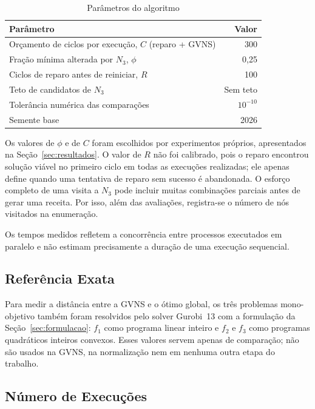 \documentclass[conference]{IEEEtran}
\newcommand{\Cparada}{300}
\begin{document}
\begin{table}[htbp]
\caption{Parâmetros do algoritmo}
\centering
\begin{tabular}{p{} r}
\toprule
\textbf{Parâmetro} & \textbf{Valor} \\
\midrule
Orçamento de ciclos por execução, $C$ (reparo + GVNS) & \Cparada \\
Fração mínima alterada por $N_3$, $\phi$ & 0{,}25 \\
Ciclos de reparo antes de reiniciar, $R$ & 100 \\
Teto de candidatos de $N_3$ & Sem teto \\
Tolerância numérica das comparações & $10^{-10}$ \\
Semente base & 2026 \\
\bottomrule
\end{tabular}
\label{tab:parametros_alg}
\end{table}

Os valores de $\phi$ e de $C$ foram escolhidos por experimentos próprios, apresentados na Seção~\ref{sec:resultados}. O valor de $R$ não foi calibrado, pois o reparo encontrou solução viável no primeiro ciclo em todas as execuções realizadas; ele apenas define quando uma tentativa de reparo sem sucesso é abandonada. O esforço completo de uma visita a $N_3$ pode incluir muitas combinações parciais antes de gerar uma receita. Por isso, além das avaliações, registra-se o número de nós visitados na enumeração.

Os tempos medidos refletem a concorrência entre processos executados em paralelo e não estimam precisamente a duração de uma execução sequencial.

\subsection{Referência Exata}
Para medir a distância entre a GVNS e o ótimo global, os três problemas mono-objetivo também foram resolvidos pelo solver Gurobi~13 com a formulação da Seção~\ref{sec:formulacao}: $f_1$ como programa linear inteiro e $f_2$ e $f_3$ como programas quadráticos inteiros convexos. Esses valores servem apenas de comparação; não são usados na GVNS, na normalização nem em nenhuma outra etapa do trabalho.

\subsection{Número de Execuções}
\end{document}
